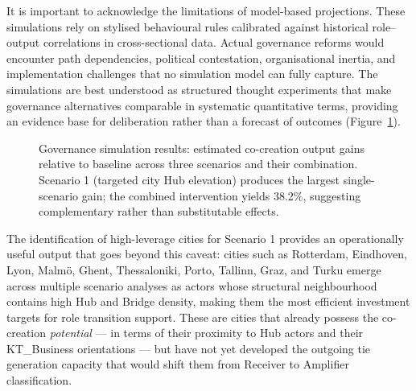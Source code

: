 \documentclass[review,12pt]{elsarticle}
\begin{document}
It is important to acknowledge the limitations of model-based projections. These simulations rely on stylised behavioural rules calibrated against historical role--output correlations in cross-sectional data. Actual governance reforms would encounter path dependencies, political contestation, organisational inertia, and implementation challenges that no simulation model can fully capture. The simulations are best understood as structured thought experiments that make governance alternatives comparable in systematic quantitative terms, providing an evidence base for deliberation rather than a forecast of outcomes (Figure~\ref{fig:simulation}).

\begin{figure}[htbp]
\centering
{}
\caption{Governance simulation results: estimated co-creation output gains relative to baseline across three scenarios and their combination. Scenario 1 (targeted city Hub elevation) produces the largest single-scenario gain; the combined intervention yields 38.2\%, suggesting complementary rather than substitutable effects.}
\label{fig:simulation}
\end{figure}

The identification of high-leverage cities for Scenario 1 provides an operationally useful output that goes beyond this caveat: cities such as Rotterdam, Eindhoven, Lyon, Malmö, Ghent, Thessaloniki, Porto, Tallinn, Graz, and Turku emerge across multiple scenario analyses as actors whose structural neighbourhood contains high Hub and Bridge density, making them the most efficient investment targets for role transition support. These are cities that already possess the co-creation \emph{potential} --- in terms of their proximity to Hub actors and their KT\_Business orientations --- but have not yet developed the outgoing tie generation capacity that would shift them from Receiver to Amplifier classification.
\end{document}
